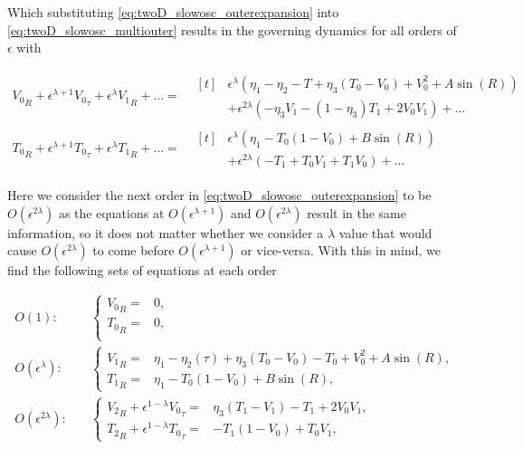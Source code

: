 Which substituting \eqref{eq:twoD_slowosc_outerexpansion} into \eqref{eq:twoD_slowosc_multiouter} results in the governing dynamics for all orders of $\epsilon$ with

\begin{equation*}
\begin{aligned}
{V_0}_R+\epsilon^{\lambda+1}{V_0}_\tau+\epsilon^\lambda {V_1}_R+\ldots=&\begin{aligned}[t]&
\epsilon^\lambda \left(\eta_1-\eta_2-T+\eta_3(T_0-V_0)+V_0^2+A\sin(R)\right)\\
&+\epsilon^{2\lambda}\left(-\eta_3 V_1-(1-\eta_3)T_1+2V_0V_1\right)+\ldots
\end{aligned}\\
{T_0}_R+\epsilon^{\lambda+1}{T_0}_\tau+\epsilon^\lambda {T_1}_R+\ldots=&\begin{aligned}[t]&
\epsilon^\lambda\left( \eta_1-T_0(1-V_0)+B\sin(R)\right)\\
&+\epsilon^{2\lambda}\left(-T_1+T_0V_1+T_1V_0\right)+\ldots
\end{aligned}
\end{aligned}
\end{equation*}

Here we consider the next order in \eqref{eq:twoD_slowosc_outerexpansion} to be $O(\epsilon^{2\lambda})$ as the equations at $O(\epsilon^{\lambda+1})$ and $O(\epsilon^{2\lambda})$ result in the same information, so it does not matter whether we consider a $\lambda$ value that would cause $O(\epsilon^{2\lambda})$ to come before $O(\epsilon^{\lambda+1})$ or vice-versa. With this in mind, we find the following sets of equations at each order

\begin{align}
\label{eq:twoD_slowosc_outerO1}
O(1):\quad & \begin{cases}
	{V_0}_R =&  0, \\
	{T_0}_R =&  0,\\
\end{cases}\\
\label{eq:twoD_slowosc_outerO2}
O(\epsilon^\lambda):\quad & \begin{cases}
	{V_1}_R = & \eta_1-\eta_2(\tau) +\eta_3(T_0-V_0)-T_0+V_0^2+A\sin(R),\\
	{T_1}_R =&  \eta_1-T_0(1-V_0)+B\sin(R),
\end{cases}\\
\label{eq:twoD_slowosc_outerO3}
O(\epsilon^{2\lambda}):\quad & \begin{cases}
	{V_2}_R+\epsilon^{1-\lambda}{V_0}_\tau = & \eta_3(T_1-V_1)-T_1+2V_0V_1,\\
	{T_2}_R +\epsilon^{1-\lambda}{T_0}_\tau =&  -T_1(1-V_0)+T_0V_1,
\end{cases}
\end{align}

